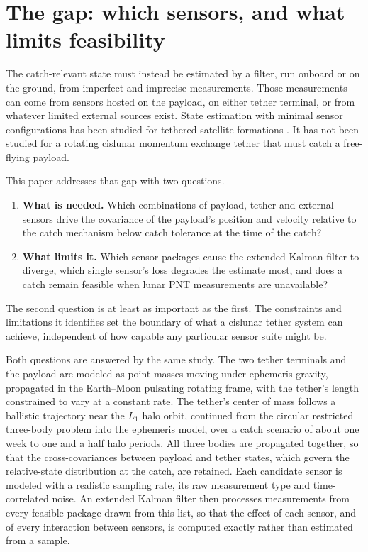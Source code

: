 \documentclass[11pt]{article}
\begin{document}
\section{The gap: which sensors, and what limits feasibility}\label{sec:gap}

The catch-relevant state must instead be estimated by a filter, run onboard or on the ground, from imperfect and imprecise measurements.
Those measurements can come from sensors hosted on the payload, on either tether terminal, or from whatever limited external sources exist.
State estimation with minimal sensor configurations has been studied for tethered satellite formations \parencite{Zhang2020,Fang2022}.
It has not been studied for a rotating cislunar momentum exchange tether that must catch a free-flying payload.

This paper addresses that gap with two questions.

\begin{enumerate}[label=\textbf{Q\arabic*.},leftmargin=3em,itemsep=4pt]
  \item \textbf{What is needed.}
        Which combinations of payload, tether and external sensors drive the covariance of the payload's position and velocity relative to the catch mechanism below catch tolerance at the time of the catch?
  \item \textbf{What limits it.}
        Which sensor packages cause the extended Kalman filter to diverge, which single sensor's loss degrades the estimate most, and does a catch remain feasible when lunar PNT measurements are unavailable?
\end{enumerate}

The second question is at least as important as the first.
The constraints and limitations it identifies set the boundary of what a cislunar tether system can achieve, independent of how capable any particular sensor suite might be.

Both questions are answered by the same study.
The two tether terminals and the payload are modeled as point masses moving under ephemeris gravity, propagated in the Earth--Moon pulsating rotating frame, with the tether's length constrained to vary at a constant rate.
The tether's center of mass follows a ballistic trajectory near the $L_1$ halo orbit, continued from the circular restricted three-body problem into the ephemeris model, over a catch scenario of about one week to one and a half halo periods.
All three bodies are propagated together, so that the cross-covariances between payload and tether states, which govern the relative-state distribution at the catch, are retained.
Each candidate sensor is modeled with a realistic sampling rate, its raw measurement type and time-correlated noise.
An extended Kalman filter then processes measurements from every feasible package drawn from this list, so that the effect of each sensor, and of every interaction between sensors, is computed exactly rather than estimated from a sample.

\printbibliography
\end{document}
